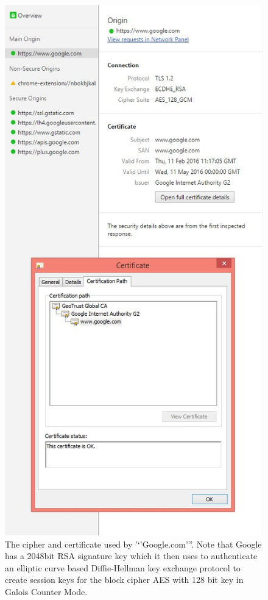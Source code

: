 \begin{figure}
\centering
\includegraphics[width=\textwidth, height=0.25\paperheight, keepaspectratio]{../figure/googletls.jpg}
\caption{The cipher and certificate used by '`'Google.com'''. Note that
Google has a 2048bit RSA signature key which it then uses to
authenticate an elliptic curve based Diffie-Hellman key exchange
protocol to create session keys for the block cipher AES with 128 bit
key in Galois Counter Mode.}
\label{tmplabelfig}
\end{figure}


